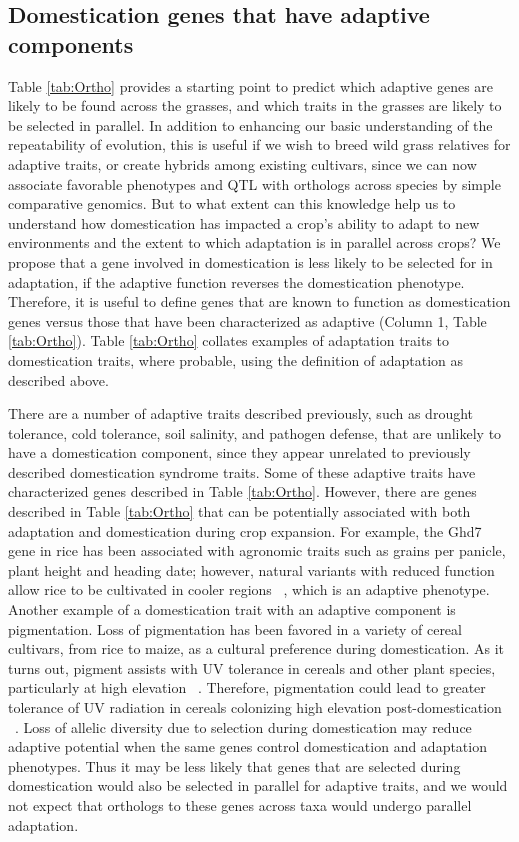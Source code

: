 \documentclass[12pt]{article}
\newcommand{\mbh}[1]{\textcolor{red}{\normalsize  #1}}
\newcommand{\mw}[1]{\textcolor{LimeGreen}{\normalsize #1}}
\begin{document}
\subsection*{Domestication genes that have adaptive components}
Table \ref{tab:Ortho} provides a starting point to predict which adaptive genes are likely to be found across the grasses, and which traits in the grasses are likely to be selected in parallel.
In addition to enhancing our basic understanding of the repeatability of evolution, this is useful if we wish to breed wild grass relatives for adaptive traits, or create hybrids among existing cultivars, since we can now associate favorable phenotypes and QTL with orthologs across species by simple comparative genomics.
But to what extent can this knowledge help us to understand how domestication has impacted a crop's ability to adapt to new environments and the extent to which adaptation is in parallel across crops? We propose that a gene involved in domestication is less likely to be selected for in adaptation, if the adaptive function reverses the domestication phenotype. 
Therefore, it is useful to define genes that are known to function as domestication genes versus those that have been characterized as adaptive (Column 1, Table \ref{tab:Ortho}). Table \ref{tab:Ortho} collates examples of adaptation traits to domestication traits, where probable, using the definition of adaptation as described above. 

There are a number of adaptive traits described previously, such as drought tolerance, cold tolerance, soil salinity, and pathogen defense, that are unlikely to have a domestication component, since they appear unrelated to previously described domestication syndrome traits. Some of these adaptive traits have characterized genes described in Table \ref{tab:Ortho}. However, there are genes described in Table \ref{tab:Ortho} that can be potentially associated with both adaptation and domestication during crop expansion.
For example, the Ghd7 gene in rice has been associated with agronomic traits such as grains per panicle, plant height and heading date; however, natural variants with reduced function allow rice to be cultivated in cooler regions ~\citep{Xue2008}, which is an adaptive phenotype. 
Another example of a domestication trait with an adaptive component is pigmentation.
Loss of pigmentation has been favored in a variety of cereal cultivars, from rice to maize, as a cultural preference during domestication.
As it turns out, pigment assists with UV tolerance in cereals and other plant species, particularly at high elevation ~\citep{pmid8058838, Gould2004}.
Therefore, pigmentation could lead to greater tolerance of UV radiation in cereals colonizing high elevation post-domestication ~\citep{Pyhjrvi2013}.
Loss of allelic diversity due to selection during domestication may reduce adaptive potential when the same genes control domestication and adaptation phenotypes.
Thus it may be less likely that genes that are selected during domestication would also be selected in parallel for adaptive traits, and we would not expect that orthologs to these genes across taxa would undergo parallel adaptation.
\end{document}
